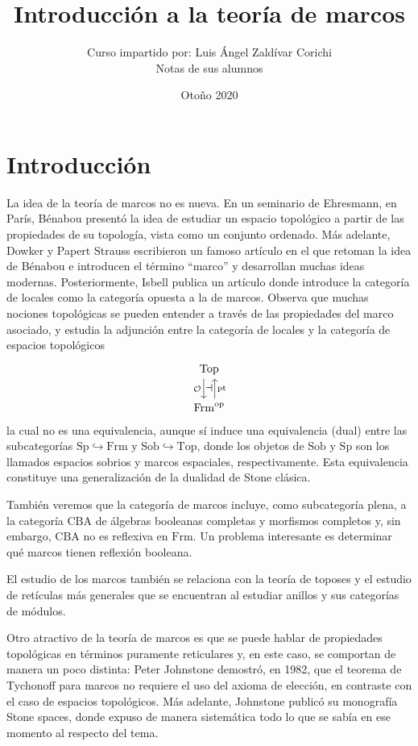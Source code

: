 \documentclass[12pt,letterpaper,titlepage]{article}
\title{Introducción a la teoría de marcos}
\author{Curso impartido por: Luis Ángel Zaldívar Corichi \\
\small{Notas de sus alumnos}}
\date{Otoño 2020}
\theoremstyle{definition}
\renewcommand\cal[1]{\mathcal{#1}}
\newcommand\<{\langle}
\renewcommand\>{\rangle}
\newcommand{\Frm}{\mathrm{Frm}}
\newcommand{\Top}{\mathrm{Top}}
\newcommand{\CBA}{\mathrm{CBA}}
\newcommand{\Sp}{\mathrm{Sp}}
\newcommand{\Sob}{\mathrm{Sob}}
\newcommand{\op}{\mathrm{op}}
\DeclareMathOperator{\pt}{pt}
\begin{document}
\maketitle

\section*{Introducción}

La idea de la teoría de marcos no es nueva.
En un seminario de Ehresmann, en París, Bénabou
presentó la idea de estudiar un espacio topológico a partir
de las propiedades de su topología, vista como un conjunto ordenado.
Más adelante, Dowker y Papert Strauss escribieron un famoso artículo
en el que retoman la idea de Bénabou e introducen el término ``marco''
y desarrollan muchas ideas modernas.
Posteriormente, Isbell publica un artículo donde introduce
la categoría de locales como la categoría opuesta a la de marcos.
Observa que muchas nociones topológicas se pueden entender
a través de las propiedades del marco asociado,
y estudia la adjunción entre la categoría de locales y la categoría
de espacios topológicos
\[
    \begin{tikzcd}
        \Top \ar[d,"\cal O"'name="izq",shift right=2] \\
        \Frm^\op \ar[u,"\pt"'name="der",shift right=2]
        \ar[from="izq", to="der","\dashv"marking,draw=none]
    \end{tikzcd}
\]
la cual no es una equivalencia,
aunque sí induce una equivalencia (dual) entre las subcategorías
$\Sp\hookrightarrow\Frm$ y $\Sob\hookrightarrow\Top$,
donde los objetos de $\Sob$ y $\Sp$ son los llamados espacios sobrios
y marcos espaciales, respectivamente.
Esta equivalencia constituye una generalización de la dualidad
de Stone clásica.

También veremos que la categoría de marcos incluye,
como subcategoría plena, a la categoría $\CBA$ de álgebras booleanas
completas y morfismos completos y, sin embargo, $\CBA$ no es reflexiva
en $\Frm$.
Un problema interesante es determinar qué marcos tienen reflexión booleana.

El estudio de los marcos también se relaciona con la teoría de toposes
y el estudio de retículas más generales que se encuentran
al estudiar anillos y sus categorías de módulos.

Otro atractivo de la teoría de marcos es que se puede hablar
de propiedades topológicas en términos puramente reticulares y,
en este caso, se comportan de manera un poco distinta:
Peter Johnstone demostró, en 1982, que el teorema de Tychonoff
para marcos no requiere el uso del axioma de elección,
en contraste con el caso de espacios topológicos.
Más adelante, Johnstone publicó su monografía Stone spaces,
donde expuso de manera sistemática todo lo que se sabía en ese momento
al respecto del tema.
\end{document}
